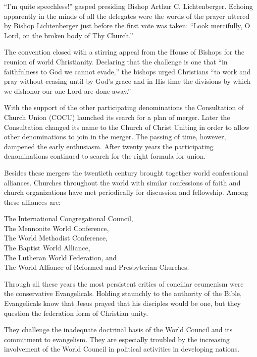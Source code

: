 “I’m quite speechless!” gasped presiding Bishop Arthur C. Lichtenberger. Echoing apparently in the
minds of all the delegates were the words of the prayer uttered by Bishop Lichtenberger just before
the first vote was taken: “Look mercifully, O Lord, on the broken body of Thy Church.”

The convention closed with a stirring appeal from the House of Bishops for the reunion of world
Christianity. Declaring that the challenge is one that “in faithfulness to God we cannot evade,” the
bishops urged Christians “to work and pray without ceasing until by God’s grace and in His time the
divisions by which we dishonor our one Lord are done away.”

With the support of the other participating denominations the Consultation of Church Union (COCU)
launched its search for a plan of merger. Later the Consultation changed its name to the Church of
Christ Uniting in order to allow other denominations to join in the merger. The passing of time,
however, dampened the early enthusiasm. After twenty years the participating denominations continued
to search for the right formula for union.

Besides these mergers the twentieth century brought together world confessional alliances. Churches
throughout the world with similar confessions of faith and church organizations have met
periodically for discussion and fellowship. Among these alliances are:

\begin{plainlines}
The International Congregational Council,\\
The Mennonite World Conference,\\
The World Methodist Conference,\\
The Baptist World Alliance,\\
The Lutheran World Federation, and\\
The World Alliance of Reformed and Presbyterian Churches.
\end{plainlines}

Through all these years the most persistent critics of conciliar ecumenism were the conservative
Evangelicals. Holding staunchly to the authority of the Bible, Evangelicals know that Jesus prayed
that his disciples would be one, but they question the federation form of Christian unity.

They challenge the inadequate doctrinal basis of the World Council and its commitment to evangelism.
They are especially troubled by the increasing involvement of the World Council in political
activities in developing nations.

